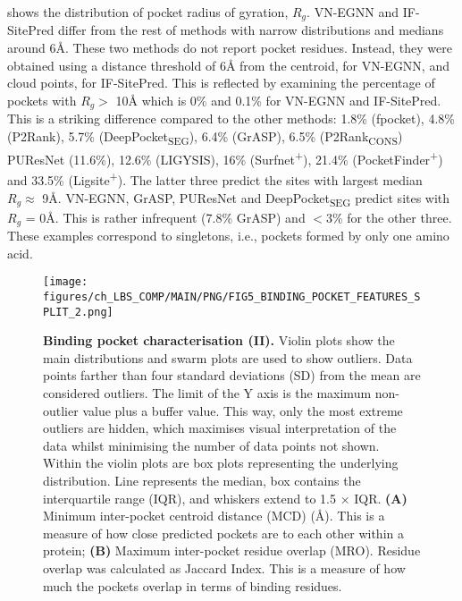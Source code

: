 shows the distribution of pocket radius of gyration, $R_{g}$. VN-EGNN and IF-SitePred differ from the rest of methods with narrow distributions and medians around 6\AA{}. These two methods do not report pocket residues. Instead, they were obtained using a distance threshold of 6\AA{} from the centroid, for VN-EGNN, and cloud points, for IF-SitePred. This is reflected by examining the percentage of pockets with $R_{g} >$ 10\AA{} which is 0\% and 0.1\% for VN-EGNN and IF-SitePred. This is a striking difference compared to the other methods: 1.8\% (fpocket), 4.8\% (P2Rank), 5.7\% (DeepPocket\textsubscript{SEG}), 6.4\% (GrASP), 6.5\% (P2Rank\textsubscript{CONS}) PUResNet (11.6\%), 12.6\% (LIGYSIS), 16\% (Surfnet\textsuperscript{+}), 21.4\% (PocketFinder\textsuperscript{+}) and 33.5\% (Ligsite\textsuperscript{+}). The latter three predict the sites with largest median $R_{g} \approx$ 9\AA{}. VN-EGNN, GrASP, PUResNet and DeepPocket\textsubscript{SEG} predict sites with $R_{g}$ = 0\AA{}. This is rather infrequent (7.8\% GrASP) and $<$3\% for the other three. These examples correspond to singletons, i.e., pockets formed by only one amino acid.

\begin{figure}[ht!]
    \centering
    \texttt{[image: figures/ch\_LBS\_COMP/MAIN/PNG/FIG5\_BINDING\_POCKET\_FEATURES\_SPLIT\_2.png]}
    \caption[Binding pocket characterisation (II)]{\textbf{Binding pocket characterisation (II).} Violin plots show the main distributions and swarm plots are used to show outliers. Data points farther than four standard deviations (SD) from the mean are considered outliers. The limit of the Y axis is the maximum non-outlier value plus a buffer value. This way, only the most extreme outliers are hidden, which maximises visual interpretation of the data whilst minimising the number of data points not shown. Within the violin plots are box plots representing the underlying distribution. Line represents the median, box contains the interquartile range (IQR), and whiskers extend to 1.5 $\times$ IQR. \textbf{(A)} Minimum inter-pocket centroid distance (MCD) (\AA{}). This is a measure of how close predicted pockets are to each other within a protein; \textbf{(B)} Maximum inter-pocket residue overlap (MRO). Residue overlap was calculated as Jaccard Index. This is a measure of how much the pockets overlap in terms of binding residues.}
    \label{fig:pocket_features_2}
\end{figure}

